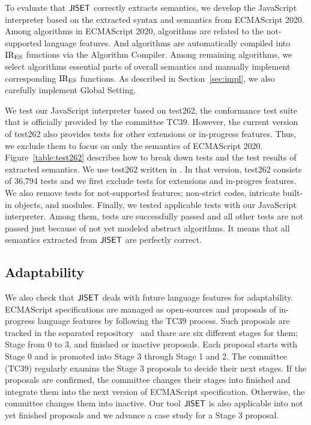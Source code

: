 To evaluate that \( \text{\sf JISET} \) correctly extracts semantics, we develop the JavaScript
interpreter based on the extracted syntax and semantics from ECMAScript 2020.
Among  algorithms in ECMAScript 2020,  algorithms
are related to the not-supported language features. And  algorithms
are automatically compiled into \( \text{IR}_\text{ES} \) functions via the \textsf{Algorithm Compiler}.
Among remaining  algorithms, we select  algorithms
essential parts of overall semantics and manually implement corresponding \( \text{IR}_\text{ES} \)
functions. As described in Section~\ref{sec:impl}, we also
carefully implement \textsf{Global Setting}.

We test our JavaScript interpreter based on test262, the conformance test suite
that is officially provided by the committee TC39. However, the current version of
test262 also provides tests for other extensions or in-progress features.
Thus, we exclude them to focus on only the semantics of ECMAScript 2020.
Figure~\ref{table:test262} describes how to break down tests and the test results of extracted
semantics. We use test262 written in . In that version,
test262 consists of 36,794 tests and we first exclude  tests
for extensions and in-progres features. We also remove  tests for
not-supported features; non-strict codes, intricate built-in objects, and modules.
Finally, we tested  applicable tests with our JavaScript interpreter.
Among them,  tests are successfully passed and all other tests are
not passed just because of not yet modeled abstract algorithms. It means that
all semantics extracted from \( \text{\sf JISET} \) are perfectly correct.


\subsection{Adaptability}

We also check that \( \text{\sf JISET} \) deals with future language features for adaptability.
ECMAScript specifications are managed as open-sources and proposals of in-progress language
features by following the TC39 process. Such proposals are tracked in the separated repository~\cite{proposals}
and thare are six different stages for them; Stage from 0 to 3, and finished or inactive proposals.
Each proposal starts with Stage 0 and is promoted into Stage 3 through Stage 1 and 2.
The committee (TC39) regularly examins the Stage 3 proposals to decide their next stages.
If the proposals are confirmed, the committee changes their stages into finished
and integrate them into the next version of ECMAScript specification.
Otherwise, the committee changes them into inactive. Our tool \( \text{\sf JISET} \) is also applicable
into not yet finished proposals and we advance a case study for a Stage 3 proposal.

